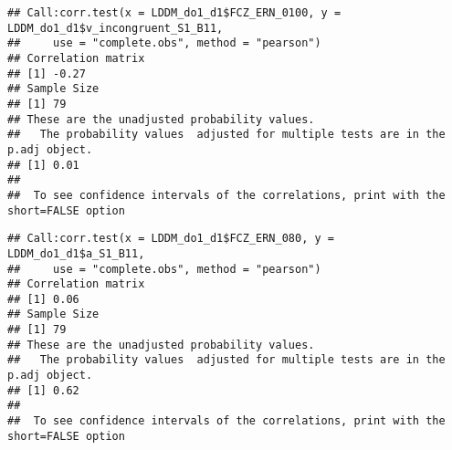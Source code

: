 \documentclass[
]{article}
\newenvironment{Shaded}{\begin{snugshade}}{\end{snugshade}}
\newcommand{\AttributeTok}[1]{\textcolor[rgb]{0.77,0.63,0.00}{#1}}
\newcommand{\FunctionTok}[1]{\textcolor[rgb]{0.00,0.00,0.00}{#1}}
\newcommand{\NormalTok}[1]{#1}
\newcommand{\SpecialCharTok}[1]{\textcolor[rgb]{0.00,0.00,0.00}{#1}}
\newcommand{\StringTok}[1]{\textcolor[rgb]{0.31,0.60,0.02}{#1}}
\begin{document}
\begin{Shaded}
\end{Shaded}

\begin{verbatim}
## Call:corr.test(x = LDDM_do1_d1$FCZ_ERN_0100, y = LDDM_do1_d1$v_incongruent_S1_B11, 
##     use = "complete.obs", method = "pearson")
## Correlation matrix 
## [1] -0.27
## Sample Size 
## [1] 79
## These are the unadjusted probability values.
##   The probability values  adjusted for multiple tests are in the p.adj object. 
## [1] 0.01
## 
##  To see confidence intervals of the correlations, print with the short=FALSE option
\end{verbatim}

\begin{Shaded}
\end{Shaded}

\begin{verbatim}
## Call:corr.test(x = LDDM_do1_d1$FCZ_ERN_080, y = LDDM_do1_d1$a_S1_B11, 
##     use = "complete.obs", method = "pearson")
## Correlation matrix 
## [1] 0.06
## Sample Size 
## [1] 79
## These are the unadjusted probability values.
##   The probability values  adjusted for multiple tests are in the p.adj object. 
## [1] 0.62
## 
##  To see confidence intervals of the correlations, print with the short=FALSE option
\end{verbatim}

\begin{Shaded}
\end{Shaded}
\end{document}
